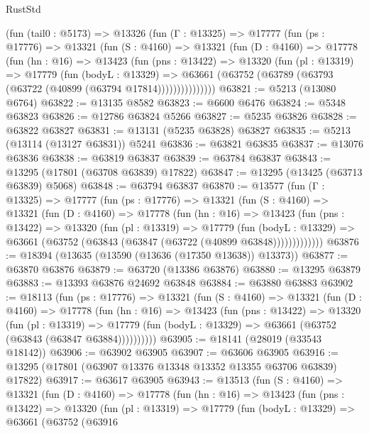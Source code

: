 \begin{lexlean}{RustStd}
\begin{coremodule}
    (fun (tail0 : @5173) =>
    @13326
      (fun (Γ : @13325) =>
      @17777
        (fun (ps : @17776) =>
        @13321
          (fun (S : @4160) =>
          @13321
            (fun (D : @4160) =>
            @17778
              (fun (hn : @16) =>
              @13423
                (fun (pns : @13422) =>
                @13320
                  (fun (pl : @13319) =>
                  @17779
                    (fun (bodyL : @13329) =>
                    @63661 (@63752 (@63789 (@63793 (@63722 (@40899 (@63794 @17814)))))))))))))))
@63821 := @5213 (@13080 @6764)
@63822 := @13135 @8582
@63823 := @6600 @6476
@63824 := @5348 @63823
@63826 := @12786 @63824 @5266
@63827 := @5235 @63826
@63828 := @63822 @63827
@63831 := @13131 (@5235 @63828) @63827
@63835 := @5213 (@13114 (@13127 @63831)) @5241
@63836 := @63821 @63835
@63837 := @13076 @63836
@63838 := @63819 @63837
@63839 := @63784 @63837
@63843 := @13295 (@17801 (@63708 @63839) @17822)
@63847 := @13295 (@13425 (@63713 @63839) @5068)
@63848 := @63794 @63837
@63870 := @13577
    (fun (Γ : @13325) =>
    @17777
      (fun (ps : @17776) =>
      @13321
        (fun (S : @4160) =>
        @13321
          (fun (D : @4160) =>
          @17778
            (fun (hn : @16) =>
            @13423
              (fun (pns : @13422) =>
              @13320
                (fun (pl : @13319) =>
                @17779
                  (fun (bodyL : @13329) =>
                  @63661 (@63752 (@63843 (@63847 (@63722 (@40899 @63848)))))))))))))
@63876 := @18394 (@13635 (@13590 (@13636 (@17350 @13638)) @13373))
@63877 := @63870 @63876
@63879 := @63720 (@13386 @63876)
@63880 := @13295 @63879
@63883 := @13393 @63876 @24692 @63848
@63884 := @63880 @63883
@63902 := @18113
    (fun (ps : @17776) =>
    @13321
      (fun (S : @4160) =>
      @13321
        (fun (D : @4160) =>
        @17778
          (fun (hn : @16) =>
          @13423
            (fun (pns : @13422) =>
            @13320
              (fun (pl : @13319) =>
              @17779 (fun (bodyL : @13329) => @63661 (@63752 (@63843 (@63847 @63884))))))))))
@63905 := @18141 (@28019 (@33543 @18142))
@63906 := @63902 @63905
@63907 := @63606 @63905
@63916 := @13295 (@17801 (@63907 @13376 @13348 @13352 @13355 @63706 @63839) @17822)
@63917 := @63617 @63905
@63943 := @13513
    (fun (S : @4160) =>
    @13321
      (fun (D : @4160) =>
      @17778
        (fun (hn : @16) =>
        @13423
          (fun (pns : @13422) =>
          @13320
            (fun (pl : @13319) =>
            @17779
              (fun (bodyL : @13329) =>
              @63661
                (@63752
                  (@63916

\end{coremodule}
\end{lexlean}
